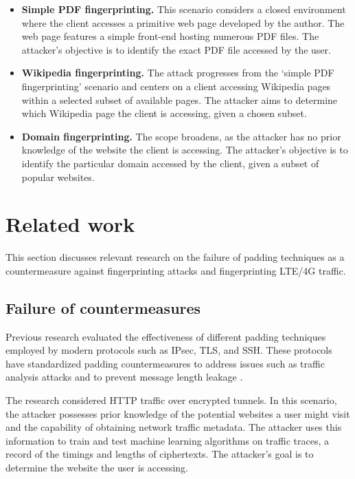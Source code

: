 \begin{itemize}
    \item \textbf{Simple PDF fingerprinting.} This scenario considers a closed environment where the client accesses a primitive web page developed by the author. The web page features a simple front-end hosting numerous PDF files. The attacker's objective is to identify the exact PDF file accessed by the user.
    
    \item \textbf{Wikipedia fingerprinting.} The attack progresses from the `simple PDF fingerprinting' scenario and centers on a client accessing Wikipedia pages within a selected subset of available pages. The attacker aims to determine which Wikipedia page the client is accessing, given a chosen subset. 
    
    \item \textbf{Domain fingerprinting.} The scope broadens, as the attacker has no prior knowledge of the website the client is accessing. The attacker's objective is to identify the particular domain accessed by the client, given a subset of popular websites.
\end{itemize}  	

\section{Related work \label{sec:related-intro}}

This section discusses relevant research on the failure of padding techniques as a countermeasure against fingerprinting attacks and fingerprinting LTE/4G traffic.

\subsection{Failure of countermeasures\label{subsec:failure-intro}}

Previous research \cite{DBLP:conf/sp/DyerCRS12} evaluated the effectiveness of different padding techniques employed by modern protocols such as IPsec, TLS, and SSH. These protocols have standardized padding countermeasures \cite{RFC4303, RFC7685, RFC4253} to address issues such as traffic analysis attacks and to prevent message length leakage \cite{DBLP:conf/sp/DegabrieleP07, DBLP:conf/fse/Kelsey02, DBLP:conf/ndss/PatersonA12}.

The research considered HTTP traffic over encrypted tunnels. In this scenario, the attacker possesses prior knowledge of the potential websites a user might visit and the capability of obtaining network traffic metadata. The attacker uses this information to train and test machine learning algorithms on traffic traces, a record of the timings and lengths of ciphertexts. The attacker's goal is to determine the website the user is accessing.

